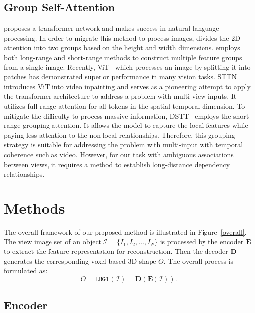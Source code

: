 \documentclass[10pt,twocolumn,letterpaper]{article}
\def\mD{{\bm{D}}}
\def\mE{{\bm{E}}}
\begin{document}
\subsection{Group Self-Attention}
\cite{vaswani2017attention} proposes a transformer network and makes success in natural language processing. In order to migrate this method to process images, \cite{Fwang2020axial} divides the 2D attention into two groups based on the height and width dimensions. \cite{huang2019interlaced} employs both long-range and short-range methods to construct multiple feature groups from a single image. Recently, ViT~\cite{dosovitskiy2021image} which processes an image by splitting it into patches has demonstrated superior performance in many vision tasks. STTN~\cite{zeng2020learning} introduces ViT into video inpainting and serves as a pioneering attempt to apply the transformer architecture to address a problem with multi-view inputs. It utilizes full-range attention for all tokens in the spatial-temporal dimension. To mitigate the difficulty to process massive information, DSTT~\cite{liu2021decoupled} employs the short-range grouping attention. It allows the model to capture the local features while paying less attention to the non-local relationships. Therefore, this grouping strategy is suitable for addressing the problem with multi-input with temporal coherence such as video. However, for our task with ambiguous associations between views, it requires a method to establish long-distance dependency relationships.

\section{Methods}

The overall framework of our proposed method is illustrated in Figure~\ref{overall}. The view image set of an object $\mathcal{I}=\{I_1,I_2,\ldots,I_N\}$ is processed by the encoder $\mE$ to extract the feature representation for reconstruction. Then the decoder $\mD$ generates the corresponding voxel-based 3D shape $O$. The overall process is formulated as:
\begin{equation}
  O = \mathtt{LRGT}(\mathcal{I}) = \mD(\mE(\mathcal{I})). 
\end{equation}

\subsection{Encoder}
\end{document}

